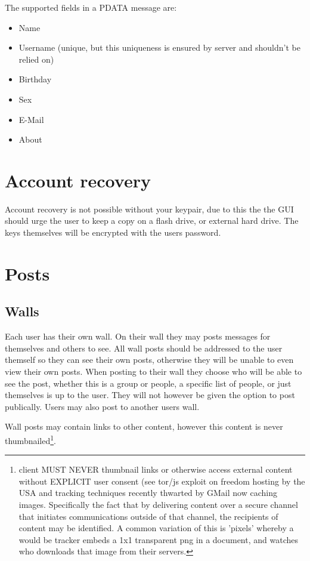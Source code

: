 The supported fields in a PDATA message are:
    \begin{itemize}
        \item Name
        \item Username (unique, but this uniqueness is ensured by server and
              shouldn't be relied on)
        \item Birthday
        \item Sex
        \item E-Mail
        \item About
    \end{itemize}

\section{Account recovery}
Account recovery is not possible without your keypair, due to this the the GUI
should urge the user to keep a copy on a flash drive, or external hard drive.
The keys themselves will be encrypted with the users password.

\section{Posts}
\subsection{Walls}
Each user has their own wall. On their wall they may posts messages for
themselves and others to see. All wall posts should be addressed to the user
themself so they can see their own posts, otherwise they will be unable to even
view their own posts. When posting to their wall they choose who will be able to
see the post, whether this is a group or people, a specific list of people, or
just themselves is up to the user. They will not however be given the option to
post publically. Users may also post to another users wall.

Wall posts may contain links to other content, however this content is never
thumbnailed\footnote{client MUST NEVER thumbnail links or otherwise access
external content without EXPLICIT user consent (see tor/js exploit on freedom
hosting by the USA and tracking techniques recently thwarted by GMail now
caching images. Specifically the fact that by delivering content over a secure
channel that initiates communications outside of that channel, the recipients of
content may be identified. A common variation of this is 'pixels' whereby a
would be tracker embeds a 1x1 transparent png in a document, and watches who
downloads that image from their servers.\cite{webbug}}.

